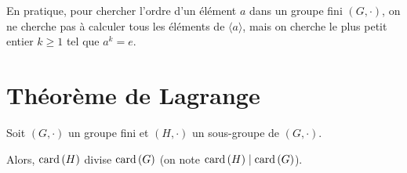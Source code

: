 \documentclass[12pt, a4paper]{report}
\begin{document}
\begin{methodbox}
    En pratique, pour chercher l'ordre d'un élément $a$ dans un groupe fini $(G,\cdot)$, on ne cherche pas à calculer tous les éléments de $\langle a \rangle$, mais on cherche le plus petit entier $k \ge 1$ tel que $a^k = e$.
\end{methodbox}

\section{Théorème de Lagrange}

\begin{theorem}
    Soit $(G,\cdot)$ un groupe fini et $(H,\cdot)$ un sous-groupe de $(G,\cdot)$.

    Alors, $\mathrm{card}\left(H\right)$ divise $\mathrm{card}\left(G\right)$ (on note $\mathrm{card}\left(H\right) \mid \mathrm{card}\left(G\right)$).
\end{theorem}
\end{document}
